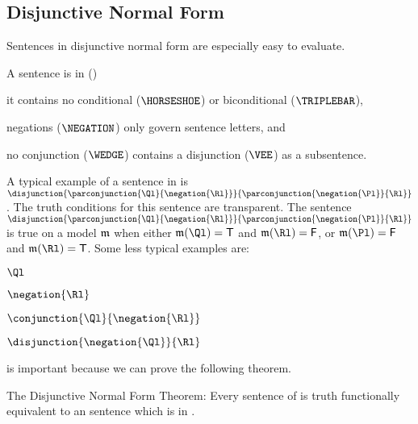 \subsection{Disjunctive Normal Form}\label{Disjunctive Normal Form}

Sentences in disjunctive normal form are especially easy to evaluate.  
\begin{majorILnc}{}
A \GSL{} sentence is in  () \Iff
\begin{cenumerate}
\item it contains no conditional ($\HORSESHOE$) or biconditional ($\TRIPLEBAR$),
\item negations ($\NEGATION$) only govern sentence letters, and
\item no conjunction ($\WEDGE$) contains a disjunction ($\VEE$) as a subsentence.
\end{cenumerate}
\end{majorILnc}
\noindent{}A typical example of a sentence in  is $\disjunction{\parconjunction{\Ql}{\negation{\Rl}}}{\parconjunction{\negation{\Pl}}{\Rl}}$.  The truth conditions for this sentence are transparent.  The sentence $\disjunction{\parconjunction{\Ql}{\negation{\Rl}}}{\parconjunction{\negation{\Pl}}{\Rl}}$ is true on a model $\mathfrak{m}$ when either $\IntA(\Ql)=\TrueB$ and $\IntA(\Rl)=\FalseB$, or $\IntA(\Pl)=\FalseB$ and $\IntA(\Rl)=\TrueB$.  Some less typical examples are:
\begin{menumerate}
\item $\Ql$
\item $\negation{\Rl}$
\item $\conjunction{\Ql}{\negation{\Rl}}$
\item $\disjunction{\negation{\Ql}}{\Rl}$
\end{menumerate}
 is important because we can prove the following theorem.
\begin{THEOREM}{ The Disjunctive Normal Form Theorem:}
Every sentence of \GSL{} is truth functionally equivalent to an \GSL{} sentence which is in .
\end{THEOREM}
